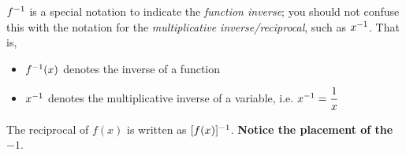 \documentclass[notes]{subfiles}
\begin{document}
		
		
		\begin{rmk}
			$f^{-1}$ is a special notation to indicate the \emph{function inverse}; you should not confuse this with the notation for the \emph{multiplicative inverse/reciprocal}, such as $x^{-1}$.  That is, 
			\begin{itemize}
				\item $f^{-1}(x)$ denotes the inverse of a function
				\item $x^{-1}$ denotes the multiplicative inverse of a variable, i.e. $x^{-1} = \dfrac{1}{x}$
			\end{itemize}
			The reciprocal of $f(x)$ is written as $[f(x)]^{-1}$.  \textbf{Notice the placement of the} $-1$.
		\end{rmk}
		
\end{document}
